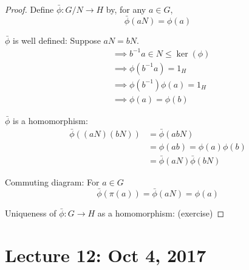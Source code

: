 \documentclass[11pt, oneside]{book}
\theoremstyle{break}
\newtheorem*{proof}{Proof}
\begin{document}
\begin{proof}
    Define $\bar{\phi} : G/N \to H$ by, for any $a \in G$,
    \begin{equation}
        \bar{\phi} (aN) = \phi(a)
    \end{equation}

    $\bar{\phi}$ is well defined: Suppose $aN = bN$.
    \begin{align*}
        &\implies b^{-1}a \in N \leq \ker(\phi) \\
        &\implies \phi(b^{-1} a) = 1_H \\
        &\implies \phi(b^{-1})\phi(a) = 1_H \\
        &\implies \phi(a) = \phi(b)
    \end{align*}

    $\bar{\phi}$ is a homomorphism:
    \begin{align*}
        \bar{\phi} ((aN)(bN)) &= \bar{\phi} (abN) \\
            &= \phi(ab) = \phi(a)\phi(b) \\
            &= \bar{\phi}(aN) \bar{\phi}(bN)
    \end{align*}

    Commuting diagram: For $a \in G$
    \begin{equation}
        \bar{\phi}(\pi(a)) = \bar{\phi} (aN) = \phi(a)
    \end{equation}

    Uniqueness of $\bar{\phi} : G \to H$ as a homomorphism: (exercise)
\end{proof}

\chapter{Lecture 12: Oct 4, 2017}
\label{chp:lec12}
\end{document}
